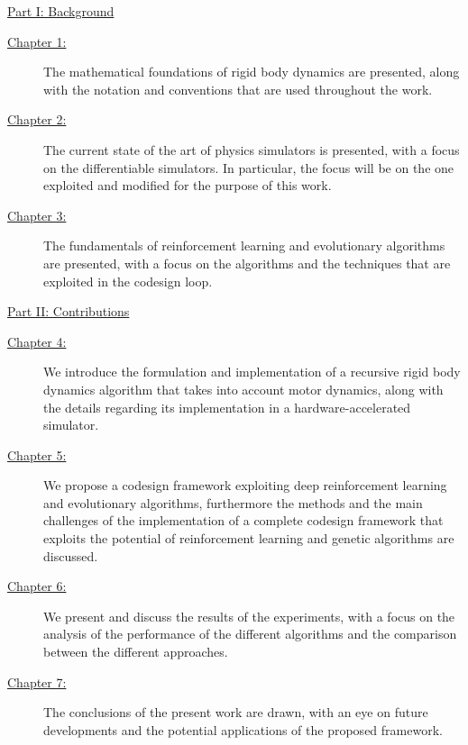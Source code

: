 \begin{description}

    \item{\hyperref[part:background]{Part I: Background}}

          \begin{description}
              \item[{\hyperref[chp:back_RBDynamics]{Chapter 1:}}] The mathematical foundations of rigid body dynamics are presented, along with the notation and conventions that are used throughout the work.
              \item[{\hyperref[chp:back_PhysicsSimulators]{Chapter 2:}}] The current state of the art of physics simulators is presented, with a focus on the differentiable simulators. In particular, the focus will be on the one exploited and modified for the purpose of this work.
              \item [{\hyperref[chp:back_RLGA]{Chapter 3:}}] The fundamentals of reinforcement learning and evolutionary algorithms are presented, with a focus on the algorithms and the techniques that are exploited in the codesign loop.
          \end{description}

    \item{\hyperref[part:contributions]{Part II: Contributions}}

          \begin{description}
              \item[{\hyperref[chp:contrib_ABA]{Chapter 4:}}] We introduce the formulation and implementation of a recursive rigid body dynamics algorithm that takes into account motor dynamics, along with the details regarding its implementation in a hardware-accelerated simulator.
              \item[{\hyperref[chp:contrib_CodesignRL]{Chapter 5:}}] We propose a codesign framework exploiting deep reinforcement learning and evolutionary algorithms, furthermore the methods and the main challenges of the implementation of a complete codesign framework that exploits the potential of reinforcement learning and genetic algorithms are discussed.
              \item[{\hyperref[chp:contrib_ResultsDiscussion]{Chapter 6:}}] We present and discuss the results of the experiments, with a focus on the analysis of the performance of the different algorithms and the comparison between the different approaches.
              \item[{\hyperref[chp:contrib_Conclusions]{Chapter 7:}}] The conclusions of the present work are drawn, with an eye on future developments and the potential applications of the proposed framework.
          \end{description}
\end{description}
